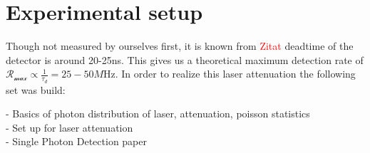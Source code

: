 \section*{Experimental setup}

Though not measured by ourselves first, it is known from \textcolor{red}{Zitat} deadtime of the detector is around 20-25ns.
This gives us a theoretical maximum detection rate of $\mathcal{R_{\max}} \propto \frac{1}{\tau_{d}} = 25-50\si{M\Hz}$.
In order to realize this laser attenuation the following set was build:





- Basics of photon distribution of laser, attenuation, poisson statistics \\
- Set up for laser attenuation \\
- Single Photon Detection paper \\



